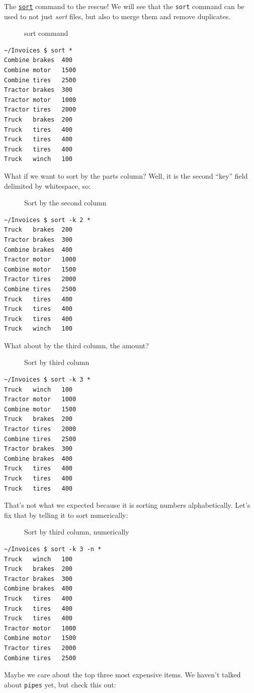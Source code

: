 \documentclass[10pt,]{book}
\numberwithin{figure}{chapter}
\DeclareRobustCommand{\drcap}[1]{\begin{figure}[H]\caption{#1}\end{figure}}
\DeclareRobustCommand{\drcmd}[1]{\index{Commands!#1}}
\begin{document}
The \href{http://linux.die.net/man/1/sort}{\texttt{sort}}\drcmd{sort}
command to the rescue! We will see that the \texttt{sort} command can be
used to not just \emph{sort} files, but also to merge them and remove
duplicates.

\drcap{sort command}

\begin{verbatim}
~/Invoices $ sort *
Combine brakes  400
Combine motor   1500
Combine tires   2500
Tractor brakes  300
Tractor motor   1000
Tractor tires   2000
Truck   brakes  200
Truck   tires   400
Truck   tires   400
Truck   tires   400
Truck   winch   100
\end{verbatim}

What if we want to sort by the parts column? Well, it is the second
``key'' field delimited by whitespace, so:

\drcap{Sort by the second column}

\begin{verbatim}
~/Invoices $ sort -k 2 *
Truck   brakes  200
Tractor brakes  300
Combine brakes  400
Tractor motor   1000
Combine motor   1500
Tractor tires   2000
Combine tires   2500
Truck   tires   400
Truck   tires   400
Truck   tires   400
Truck   winch   100
\end{verbatim}

What about by the third column, the amount?

\drcap{Sort by third column}

\begin{verbatim}
~/Invoices $ sort -k 3 *
Truck   winch   100
Tractor motor   1000
Combine motor   1500
Truck   brakes  200
Tractor tires   2000
Combine tires   2500
Tractor brakes  300
Combine brakes  400
Truck   tires   400
Truck   tires   400
Truck   tires   400
\end{verbatim}

That's not what we expected because it is sorting numbers
alphabetically. Let's fix that by telling it to sort numerically:

\drcap{Sort by third column, numerically}

\begin{verbatim}
~/Invoices $ sort -k 3 -n *
Truck   winch   100
Truck   brakes  200
Tractor brakes  300
Combine brakes  400
Truck   tires   400
Truck   tires   400
Truck   tires   400
Tractor motor   1000
Combine motor   1500
Tractor tires   2000
Combine tires   2500
\end{verbatim}

Maybe we care about the top three most expensive items. We haven't
talked about \texttt{pipes} yet, but check this out:
\end{document}
